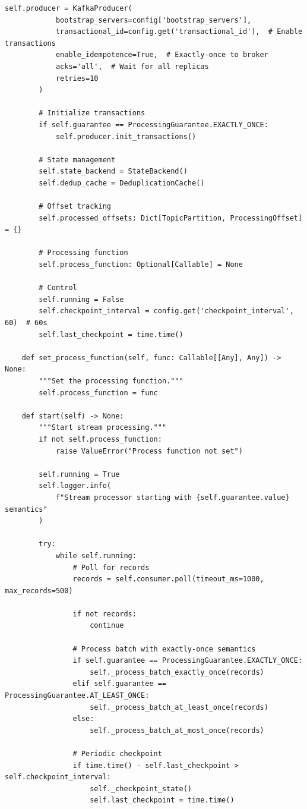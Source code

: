 \begin{lstlisting}[style=python, caption=StreamProcessor with Exactly-Once Guarantees]
        self.producer = KafkaProducer(
            bootstrap_servers=config['bootstrap_servers'],
            transactional_id=config.get('transactional_id'),  # Enable transactions
            enable_idempotence=True,  # Exactly-once to broker
            acks='all',  # Wait for all replicas
            retries=10
        )

        # Initialize transactions
        if self.guarantee == ProcessingGuarantee.EXACTLY_ONCE:
            self.producer.init_transactions()

        # State management
        self.state_backend = StateBackend()
        self.dedup_cache = DeduplicationCache()

        # Offset tracking
        self.processed_offsets: Dict[TopicPartition, ProcessingOffset] = {}

        # Processing function
        self.process_function: Optional[Callable] = None

        # Control
        self.running = False
        self.checkpoint_interval = config.get('checkpoint_interval', 60)  # 60s
        self.last_checkpoint = time.time()

    def set_process_function(self, func: Callable[[Any], Any]) -> None:
        """Set the processing function."""
        self.process_function = func

    def start(self) -> None:
        """Start stream processing."""
        if not self.process_function:
            raise ValueError("Process function not set")

        self.running = True
        self.logger.info(
            f"Stream processor starting with {self.guarantee.value} semantics"
        )

        try:
            while self.running:
                # Poll for records
                records = self.consumer.poll(timeout_ms=1000, max_records=500)

                if not records:
                    continue

                # Process batch with exactly-once semantics
                if self.guarantee == ProcessingGuarantee.EXACTLY_ONCE:
                    self._process_batch_exactly_once(records)
                elif self.guarantee == ProcessingGuarantee.AT_LEAST_ONCE:
                    self._process_batch_at_least_once(records)
                else:
                    self._process_batch_at_most_once(records)

                # Periodic checkpoint
                if time.time() - self.last_checkpoint > self.checkpoint_interval:
                    self._checkpoint_state()
                    self.last_checkpoint = time.time()


\end{lstlisting}
